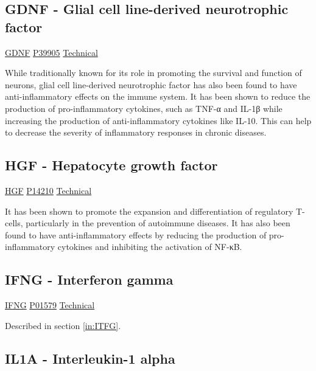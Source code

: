 \subsection{GDNF - Glial cell line-derived neurotrophic factor}

\href{https://en.wikipedia.org/wiki/Glial\_cell\_line-derived\_neurotrophic\_factor}{GDNF}
\href{http://www.uniprot.org/uniprot/P39905}{P39905}
\href{https://olink.com/products-services/target/protein/?assayID=5066}{Technical}

While traditionally known for its role in promoting the survival and function of neurons, glial cell line-derived neurotrophic factor has also been found to have anti-inflammatory effects on the immune system. It has been shown to reduce the production of pro-inflammatory cytokines, such as TNF-α and IL-1β while increasing the production of anti-inflammatory cytokines like IL-10. This can help to decrease the severity of inflammatory responses in chronic diseases.

\subsection{HGF - Hepatocyte growth factor}

\href{https://en.wikipedia.org/wiki/Hepatocyte\_growth\_factor}{HGF}
\href{http://www.uniprot.org/uniprot/P14210}{P14210}
\href{https://olink.com/products-services/target/protein/?assayID=5107}{Technical}

It has been shown to promote the expansion and differentiation of regulatory T-cells, particularly in the prevention of autoimmune diseases. It has also been found to have anti-inflammatory effects by reducing the production of pro-inflammatory cytokines and inhibiting the activation of NF-κB.

\subsection{IFNG - Interferon gamma}

\href{https://en.wikipedia.org/wiki/Interferon\_gamma}{IFNG}
\href{http://www.uniprot.org/uniprot/P01579}{P01579}
\href{https://olink.com/products-services/target/protein/?assayID=5109}{Technical}

Described in section \ref{in:ITFG}.

\subsection{IL1A - Interleukin-1 alpha}


